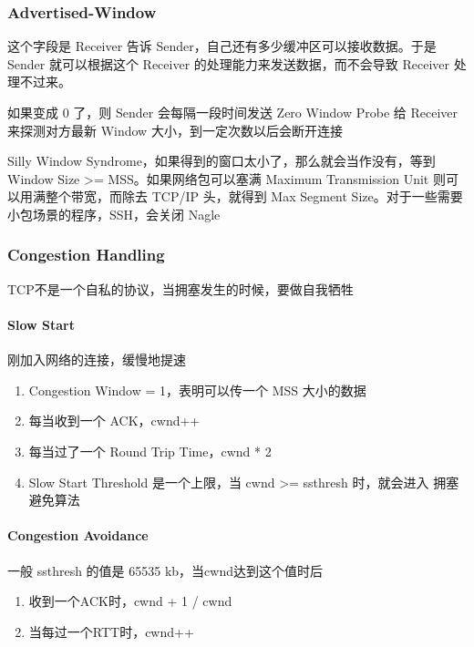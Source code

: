 \documentclass[11pt,journal,compsoc]{IEEEtran}
\begin{document}
\subsubsection{Advertised-Window}

这个字段是 Receiver 告诉 Sender，自己还有多少缓冲区可以接收数据。于是 Sender 就可以根据这个 Receiver 的处理能力来发送数据，而不会导致 Receiver 处理不过来。

如果变成 0 了，则 Sender 会每隔一段时间发送 Zero Window Probe 给 Receiver 来探测对方最新 Window 大小，到一定次数以后会断开连接

Silly Window Syndrome，如果得到的窗口太小了，那么就会当作没有，等到 Window Size >= MSS。如果网络包可以塞满 Maximum Transmission Unit 则可以用满整个带宽，而除去 TCP/IP 头，就得到 Max Segment Size。对于一些需要小包场景的程序，SSH，会关闭 Nagle


\subsubsection{Congestion Handling}

TCP不是一个自私的协议，当拥塞发生的时候，要做自我牺牲

\paragraph{Slow Start}

刚加入网络的连接，缓慢地提速

\begin{enumerate}
    \item Congestion Window = 1，表明可以传一个 MSS 大小的数据

    \item 每当收到一个 ACK，cwnd++

    \item 每当过了一个 Round Trip Time，cwnd * 2

    \item Slow Start Threshold 是一个上限，当 cwnd >= ssthresh 时，就会进入 拥塞避免算法
\end{enumerate}

\paragraph{Congestion Avoidance}

一般 ssthresh 的值是 65535 kb，当cwnd达到这个值时后

\begin{enumerate}
    \item 收到一个ACK时，cwnd + 1 / cwnd

    \item 当每过一个RTT时，cwnd++
\end{enumerate}
\end{document}
